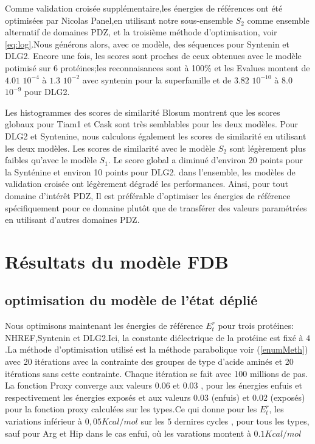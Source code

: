 Comme validation croisée supplémentaire,les énergies de références ont été optimisées par Nicolas Panel,en utilisant notre sous-ensemble $S_2$ comme ensemble alternatif de domaines PDZ, et la troisième méthode d'optimisation, voir \ref{eq:log}.Nous générons alors, avec ce modèle, des séquences pour Syntenin et DLG2.
Encore une fois, les scores sont proches de ceux obtenues avec le modèle potimisé sur 6 protéines;les reconnaisances sont à 100\% et les Evalues montent de $4.01$ $10^{-4}$  à $1.3$ $10^{-2}$  avec syntenin pour la superfamille et de $3.82$ $10^{-10}$  à $8.0$ $10^{-9}$ pour DLG2.

Les histogrammes des scores de similarité Blosum montrent que les scores globaux pour Tiam1 et Cask sont très semblables pour les deux modèles. Pour DLG2 et Syntenine, nous calculons également les scores de similarité en utilisant les deux modèles. Les scores de similarité avec le modèle $S_2$  sont légèrement plus faibles qu'avec le  modèle $S_1$. Le score global a diminué d'environ 20 points pour la Synténine et environ 10 points pour DLG2. dans l'ensemble, les modèles de validation croisée ont légèrement dégradé les performances. Ainsi, pour tout domaine d'intérêt PDZ, Il est préférable d'optimiser les énergies de référence spécifiquement pour ce domaine plutôt que de transférer des valeurs paramétrées en utilisant d'autres domaines PDZ. 

\section{Résultats du modèle FDB}

\subsection{optimisation du modèle de l'état déplié}

Nous optimisons maintenant les énergies de référence $E_t^r$ pour trois protéines: NHREF,Syntenin et DLG2.Ici, la constante diélectrique de la protéine est fixé à $4$.La méthode d'optimisation utilisé est la méthode parabolique voir (\ref{enumMeth}) avec 20 itérations avec la contrainte des groupes de type d'acide aminés et 20 itérations sans cette contrainte. Chaque itération se fait avec 100 millions de pas. La fonction Proxy converge aux valeurs $0.06$ et $0.03$ , pour les énergies enfuis et respectivement les énergies exposés et aux valeurs $0.03$ (enfuis) et $0.02$ (exposés) pour la fonction proxy calculées sur les types.Ce qui donne pour les $E_t^r$, les variations inférieur à $0,05 Kcal/mol$ sur les $5$ dernires cycles , pour tous les types, sauf pour Arg et Hip dans le cas enfui, où les varations montent à $0.1 Kcal/mol$

